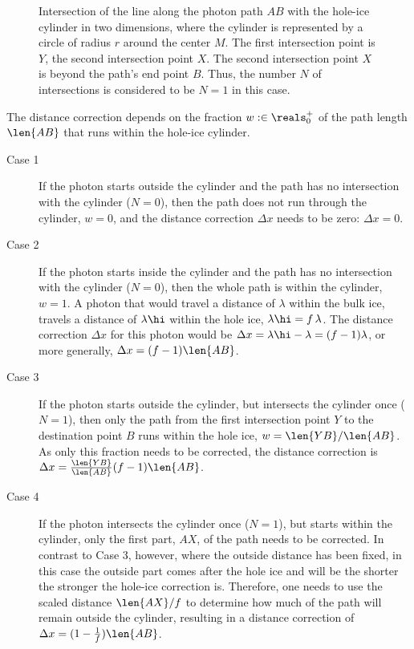 \begin{figure}[htbp]
  \caption{Intersection of the line along the photon path $AB$ with the hole-ice cylinder in two dimensions, where the cylinder is represented by a circle of radius $r$ around the center $M$. The first intersection point is $Y$, the second intersection point $X$. The second intersection point $X$ is beyond the path's end point $B$. Thus, the number $N$ of intersections is considered to be $N=1$ in this case.}
  \label{fig:iefai4iV}
\end{figure}

The distance correction depends on the fraction $w :\in \reals^+_0$ of the path length $\len{AB}$ that runs within the hole-ice cylinder.

\begin{description}
  \item[Case 1] If the photon starts outside the cylinder and the path has no intersection with the cylinder ($N = 0$), then the path does not run through the cylinder, $w = 0$, and the distance correction $\Delta x$ needs to be zero: $\Delta x = 0$.
  \item[Case 2] If the photon starts inside the cylinder and the path has no intersection with the cylinder ($N = 0$), then the whole path is within the cylinder, $w = 1$. A photon that would travel a distance of $\lambda$ within the bulk ice, travels a distance of $\lambda\hi$ within the hole ice, $\lambda\hi = f\,\lambda$. The distance correction $\Delta x$ for this photon would be $\Delta x = \lambda\hi - \lambda = (f - 1)\lambda$, or more generally, $\Delta x = (f - 1) \len{AB}$.
  \item[Case 3] If the photon starts outside the cylinder, but intersects the cylinder once ($N = 1$), then only the path from the first intersection point $Y$ to the destination point $B$ runs within the hole ice, $w = \len{YB} / \len{AB}$. As only this fraction needs to be corrected, the distance correction is $\Delta x = \frac{\len{YB}}{\len{AB}}(f - 1)\len{AB}$.
  \item[Case 4] If the photon intersects the cylinder once ($N = 1$), but starts within the cylinder, only the first part, $AX$, of the path needs to be corrected. In contrast to Case 3, however, where the outside distance has been fixed, in this case the outside part comes after the hole ice and will be the shorter the stronger the hole-ice correction is. Therefore, one needs to use the scaled distance $\len{AX} / f$ to determine how much of the path will remain outside the cylinder, resulting in a distance correction of $\Delta x = (1 - \frac{1}{f})\len{AB}$.

\end{description}
